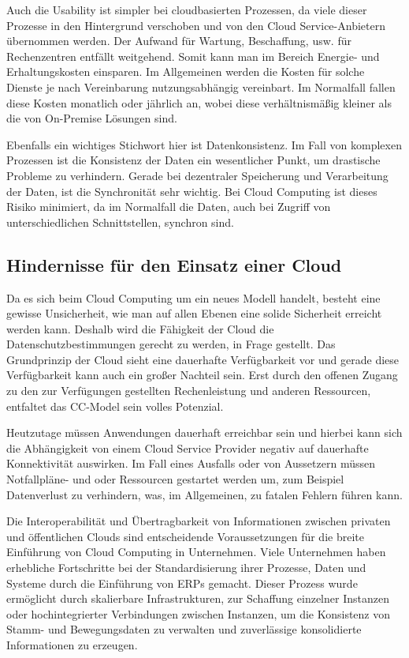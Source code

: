 Auch die Usability ist simpler bei cloudbasierten Prozessen, da viele dieser Prozesse in den Hintergrund verschoben und von den Cloud Service-Anbietern übernommen werden. Der Aufwand für Wartung, Beschaffung, usw. für Rechenzentren entfällt weitgehend. Somit kann man im Bereich Energie- und Erhaltungskosten einsparen. Im Allgemeinen werden die Kosten für solche Dienste je nach Vereinbarung nutzungsabhängig vereinbart. Im Normalfall fallen diese Kosten monatlich oder jährlich an, wobei diese verhältnismäßig kleiner als die von On-Premise Lösungen sind.

Ebenfalls ein wichtiges Stichwort hier ist Datenkonsistenz. Im Fall von komplexen Prozessen ist die Konsistenz der Daten ein wesentlicher Punkt, um drastische Probleme zu verhindern. Gerade bei dezentraler Speicherung und Verarbeitung der Daten, ist die Synchronität sehr wichtig. Bei Cloud Computing ist dieses Risiko minimiert, da im Normalfall die Daten, auch bei Zugriff von unterschiedlichen Schnittstellen, synchron sind.

\subsection{Hindernisse für den Einsatz einer Cloud}

Da es sich beim Cloud Computing um ein neues Modell handelt, besteht eine gewisse Unsicherheit, wie man auf allen Ebenen eine solide Sicherheit erreicht werden kann. Deshalb wird die Fähigkeit der Cloud die Datenschutzbestimmungen gerecht zu werden, in Frage gestellt. Das Grundprinzip der Cloud sieht eine dauerhafte Verfügbarkeit vor und gerade diese Verfügbarkeit kann auch ein großer Nachteil sein. Erst durch den offenen Zugang zu den zur Verfügungen gestellten Rechenleistung und anderen Ressourcen, entfaltet das CC-Model sein volles Potenzial. 

Heutzutage müssen Anwendungen dauerhaft erreichbar sein und hierbei kann sich die Abhängigkeit von einem Cloud Service Provider negativ auf dauerhafte Konnektivität auswirken. Im Fall eines Ausfalls oder von Aussetzern müssen Notfallpläne- und oder Ressourcen gestartet werden um, zum Beispiel Datenverlust zu verhindern, was, im Allgemeinen, zu fatalen Fehlern führen kann.

Die Interoperabilität und Übertragbarkeit von Informationen zwischen privaten und öffentlichen Clouds sind entscheidende Voraussetzungen für die breite Einführung von Cloud Computing in Unternehmen. Viele Unternehmen haben erhebliche Fortschritte bei der Standardisierung ihrer Prozesse, Daten und Systeme durch die Einführung von ERPs gemacht. Dieser Prozess wurde ermöglicht durch skalierbare Infrastrukturen, zur Schaffung einzelner Instanzen oder hochintegrierter Verbindungen zwischen Instanzen, um die Konsistenz von Stamm- und Bewegungsdaten zu verwalten und zuverlässige konsolidierte Informationen zu erzeugen.
